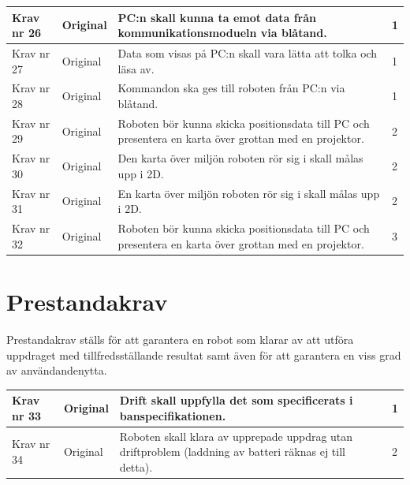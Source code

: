 \documentclass[11pt]{article}
\begin{document}
\begin{flushleft}
\begin{center}
\begin{longtable}{|l|l|p{.70\linewidth}|l|}
Krav nr 26 &
Original &
PC:n skall kunna ta emot data från kommunikationsmodueln via blåtand. &
1 \\ \hline

Krav nr 27 &
Original &
Data som visas på PC:n skall vara lätta att tolka och läsa av. &
1 \\ \hline

Krav nr 28 &
Original &
Kommandon ska ges till roboten från PC:n via blåtand. &
1 \\ \hline

Krav nr 29 &
Original &
Roboten bör kunna skicka positionsdata till PC och presentera en karta över grottan med en projektor. &
2 \\ \hline

Krav nr 30 &
Original &
Den karta över miljön roboten rör sig i skall målas upp i 2D. &
2 \\ \hline

Krav nr 31 &
Original &
En karta över miljön roboten rör sig i skall målas upp i 2D. &
2 \\ \hline

Krav nr 32 &
Original &
Roboten bör kunna skicka positionsdata till PC och presentera en karta över grottan med en projektor. &
3 \\ \hline

\end{longtable}
\end{center}


\section{Prestandakrav}
Prestandakrav ställs för att garantera en robot som klarar av att utföra uppdraget med tillfredsställande resultat samt även för att garantera en viss grad av användandenytta.

\begin{center}
\begin{longtable}{|l|l|p{.70\linewidth}|l|} \hline

Krav nr 33 &
Original &
Drift skall uppfylla det som specificerats i banspecifikationen. &
1 \\ \hline

Krav nr 34 &
Original &
Roboten skall klara av upprepade uppdrag utan driftproblem (laddning av batteri räknas ej till detta). &
2 \\ \hline

\end{longtable}
\end{center}


\end{flushleft}
\end{document}
